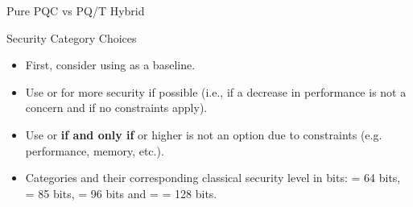\begin{minipage}[t]{0.7\textwidth}
\begin{algorithmbox}{Pure PQC vs PQ/T Hybrid}
    \end{algorithmbox}
\end{minipage}
\begin{minipage}[t]{0.28\textwidth}
    \vspace{0pt}
    \begin{algorithmbox}{Security Category Choices}
        \scriptsize
        \begin{itemize}[leftmargin=*]
            \setlength\itemsep{0em}
            \item First, consider using \hspace{-3mm} as a baseline.\\
            \item Use \hspace{-3mm} or
            \hspace{-3mm} for more security if possible (i.e., if a decrease in performance is not a concern and if no constraints apply).\\
            \item Use \hspace{-3mm} or
            \hspace{-3mm} {\bfseries if and only if} \hspace{-3mm} or higher is not an option due to constraints (e.g. performance, memory, etc.).\\
            \item Categories and their corresponding classical security level in bits: \hspace{-3mm} = 64 bits, \hspace{-3mm} = 85 bits, \hspace{-3mm} = 96 bits and \hspace{-3mm} = \hspace{-3mm} = 128 bits.\\[\baselineskip]

\end{itemize}
\end{algorithmbox}
\end{minipage}
